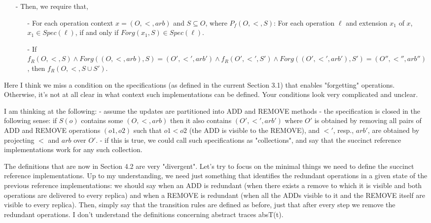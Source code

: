 \begin{itemize}
\item[-] Then, we require that, 
    \begin{itemize}
    \setlength{\itemsep}{0.5pt}
    \item[-] For each operation context $x = (O,<,\mathit{arb})$ and $S \subseteq O$, where $P_f(O,<,S)$: For each operation $\ell$ and extension $x_1$ of $x$, $x_1 \in Spec(\ell)$, if and only if $Forg(x_1,S) \in Spec(\ell)$.

    \item[-] If $f_R(O,<,S) \wedge Forg((O,<,\mathit{arb}),S) = (O',<',\mathit{arb}') \wedge f_R(O',<',S') \wedge Forg((O',<',\mathit{arb}'),S') = (O'',<'',\mathit{arb}'')$, then $f_R(O,<,S \cup S')$. 
\end{itemize} 
\end{itemize}




Here I think we miss a condition on the specifications (as defined in the current Section 3.1) that enables "forgetting" operations. Otherwise, it's not at all clear in what context such implementations can be defined. Your conditions look very complicated and unclear.

I am thinking at the following:
- assume the updates are partitioned into ADD and REMOVE methods
- the specification is closed in the following sense: if $S(o)$ contains some $(O,<,arb)$ then it also contains $(O',<',arb')$ where $O'$ is obtained by removing all pairs of ADD and REMOVE operations $(o1,o2)$ such that $o1 < o2$ (the ADD is visible to the REMOVE), and $<'$, resp., $arb'$, are obtained by projecting $<$ and $arb$ over $O'$.
- if this is true, we could call such specifications as "collections", and say that the succinct reference implementations work for any such collection.

The definitions that are now in Section 4.2 are very "divergent". Let's try to focus on the minimal things we need to define the succinct reference implementations. Up to my understanding, we need just something that identifies the redundant operations in a given state of the previous reference implementations: we should say when an ADD is redundant (when there exists a remove to which it is visible and both operations are delivered to every replica) and when a REMOVE is redundant (when all the ADDs visible to it and the REMOVE itself are visible to every replica). Then, simply say that the transition rules are defined as before, just that after every step we remove the redundant operations. I don't understand the definitions concerning abstract traces absT(t).





